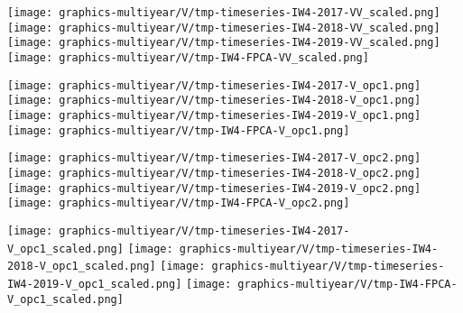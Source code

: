 
\begin{center}
\begin{minipage}{7.0in}
\texttt{[image: graphics-multiyear/V/tmp-timeseries-IW4-2017-VV\_scaled.png]}
\quad\quad
\texttt{[image: graphics-multiyear/V/tmp-timeseries-IW4-2018-VV\_scaled.png]}
\vskip 1.0cm
\texttt{[image: graphics-multiyear/V/tmp-timeseries-IW4-2019-VV\_scaled.png]}
\quad
\texttt{[image: graphics-multiyear/V/tmp-IW4-FPCA-VV\_scaled.png]}
\end{minipage}
\end{center}


\begin{center}
\begin{minipage}{7.0in}
\texttt{[image: graphics-multiyear/V/tmp-timeseries-IW4-2017-V\_opc1.png]}
\quad\quad
\texttt{[image: graphics-multiyear/V/tmp-timeseries-IW4-2018-V\_opc1.png]}
\vskip 1.0cm
\texttt{[image: graphics-multiyear/V/tmp-timeseries-IW4-2019-V\_opc1.png]}
\quad
\texttt{[image: graphics-multiyear/V/tmp-IW4-FPCA-V\_opc1.png]}
\end{minipage}
\end{center}


\begin{center}
\begin{minipage}{7.0in}
\texttt{[image: graphics-multiyear/V/tmp-timeseries-IW4-2017-V\_opc2.png]}
\quad\quad
\texttt{[image: graphics-multiyear/V/tmp-timeseries-IW4-2018-V\_opc2.png]}
\vskip 1.0cm
\texttt{[image: graphics-multiyear/V/tmp-timeseries-IW4-2019-V\_opc2.png]}
\quad
\texttt{[image: graphics-multiyear/V/tmp-IW4-FPCA-V\_opc2.png]}
\end{minipage}
\end{center}


\begin{center}
\begin{minipage}{7.0in}
\texttt{[image: graphics-multiyear/V/tmp-timeseries-IW4-2017-V\_opc1\_scaled.png]}
\quad\quad
\texttt{[image: graphics-multiyear/V/tmp-timeseries-IW4-2018-V\_opc1\_scaled.png]}
\vskip 1.0cm
\texttt{[image: graphics-multiyear/V/tmp-timeseries-IW4-2019-V\_opc1\_scaled.png]}
\quad
\texttt{[image: graphics-multiyear/V/tmp-IW4-FPCA-V\_opc1\_scaled.png]}
\end{minipage}
\end{center}

